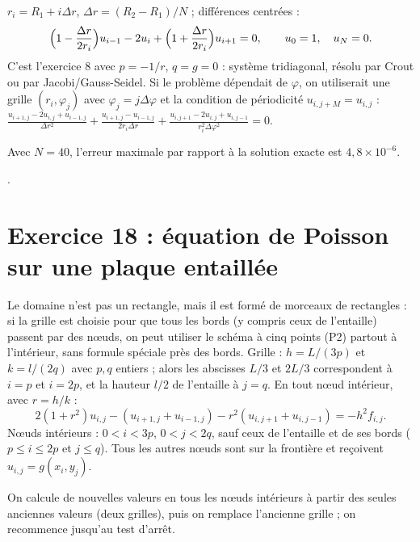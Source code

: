  $r_i = R_1 + i\Delta r$, $\Delta r = (R_2 - R_1)/N$ ; différences
centrées :
\[
  \Bigl(1 - \frac{\Delta r}{2r_i}\Bigr)u_{i-1} - 2u_i + \Bigl(1 + \frac{\Delta r}{2r_i}\Bigr)u_{i+1} = 0,
  \qquad u_0 = 1, \quad u_N = 0 .
\]
C'est l'exercice 8 avec $p = -1/r$, $q = g = 0$ : système tridiagonal,
résolu par Crout ou par Jacobi/Gauss-Seidel.
 Si le problème dépendait de $\varphi$, on utiliserait une grille
$(r_i, \varphi_j)$ avec $\varphi_j = j\Delta\varphi$ et la condition de périodicité
$u_{i,j+M} = u_{i,j}$ :
$\frac{u_{i+1,j} - 2u_{i,j} + u_{i-1,j}}{\Delta r^2}
 + \frac{u_{i+1,j} - u_{i-1,j}}{2r_i\Delta r}
 + \frac{u_{i,j+1} - 2u_{i,j} + u_{i,j-1}}{r_i^2\Delta\varphi^2} = 0$.

\Verif Avec $N = 40$, l'erreur maximale par rapport à la solution exacte est
$4{,}8\times 10^{-6}$.

\Refs {}.

\section{Exercice 18 : équation de Poisson sur une plaque entaillée}

\Pourquoi Le domaine n'est pas un rectangle, mais il est formé de morceaux de
rectangles : si la grille est choisie pour que tous les bords (y compris ceux
de l'entaille) passent par des nœuds, on peut utiliser le schéma à cinq points
(P2) partout à l'intérieur, sans formule spéciale près des bords.
\Etapes
{} Grille : $h = L/(3p)$ et $k = l/(2q)$ avec $p, q$ entiers ; alors les
abscisses $L/3$ et $2L/3$ correspondent à $i = p$ et $i = 2p$, et la hauteur
$l/2$ de l'entaille à $j = q$.
 En tout nœud intérieur, avec $r = h/k$ :
\[
  2(1 + r^2)u_{i,j} - (u_{i+1,j} + u_{i-1,j}) - r^2(u_{i,j+1} + u_{i,j-1}) = -h^2f_{i,j} .
\]
 Nœuds intérieurs : $0 < i < 3p$, $0 < j < 2q$, sauf ceux de
l'entaille et de ses bords ($p \le i \le 2p$ et $j \le q$). Tous les autres
nœuds sont sur la frontière et reçoivent $u_{i,j} = g(x_i, y_j)$.

 On calcule de nouvelles valeurs en tous les
nœuds intérieurs à partir des seules anciennes valeurs (deux grilles), puis on
remplace l'ancienne grille ; on recommence jusqu'au test d'arrêt.

